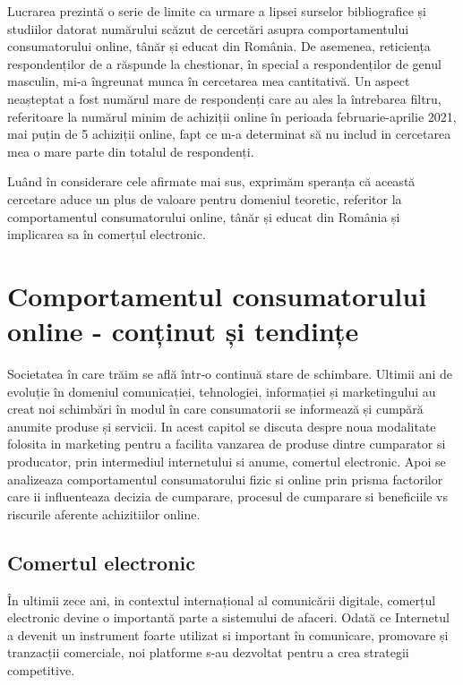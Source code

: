 \documentclass[a4paper, 12pt]{article}
\begin{document}
	\quad Lucrarea prezintă o serie de limite ca urmare a lipsei surselor bibliografice și studiilor datorat numărului scăzut de cercetări asupra comportamentului consumatorului online, tânăr și educat din România. De asemenea, reticiența respondenților de a răspunde la chestionar, în special a respondenților de genul masculin, mi-a îngreunat munca în cercetarea mea cantitativă. Un aspect neașteptat a fost numărul mare de respondenți care au ales la întrebarea filtru, referitoare la numărul minim de achiziții online în perioada februarie-aprilie 2021, mai puțin de 5 achiziții online, fapt ce m-a determinat să nu includ in cercetarea mea o mare parte din totalul de respondenți.
	
	\quad Luând în considerare cele afirmate mai sus, exprimăm speranța că această cercetare aduce un plus de valoare pentru domeniul teoretic, referitor la comportamentul consumatorului online, tânăr și educat din România și implicarea sa în comerțul electronic.
		
	\newpage
	\setcounter{section}{0}
	\section{Comportamentul consumatorului online - conținut și tendințe}
	
	\quad\quad Societatea în care trăim se află într-o continuă stare de schimbare. Ultimii ani de evoluție în domeniul comunicației, tehnologiei, informației și marketingului au creat noi schimbări în modul în care consumatorii se informează și cumpără anumite produse și servicii. In acest capitol se discuta despre noua modalitate folosita in marketing pentru a facilita vanzarea de produse dintre cumparator si producator, prin intermediul internetului si anume, comertul electronic. Apoi se analizeaza comportamentul consumatorului fizic si online prin prisma factorilor care ii influenteaza decizia de cumparare, procesul de cumparare si beneficiile vs riscurile aferente achizitiilor online.

		\subsection{Comertul electronic}
	\quad \quad\space În ultimii zece ani, in contextul internațional al comunicării digitale, comerțul electronic devine o importantă parte a sistemului de afaceri. Odată ce Internetul a devenit un instrument foarte utilizat si important în comunicare, promovare și tranzacții comerciale, noi platforme s-au dezvoltat pentru a crea strategii competitive.
	
\end{document}

